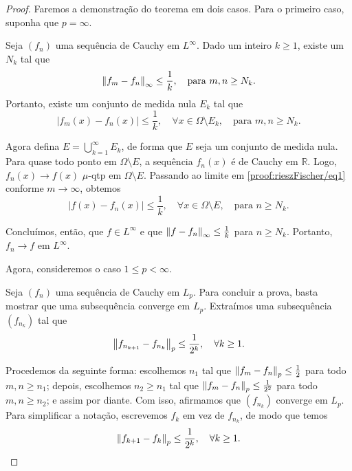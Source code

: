 \begin{proof}
    Faremos a demonstração do teorema em dois casos. Para o primeiro caso, suponha que $p=\infty$.

    Seja $(f_n)$ uma sequência de Cauchy em $L^\infty$. Dado um inteiro $k \geq 1$, existe um $N_k$ tal que
    \begin{equation}\label{proof:rieszFischer/eq1}
        \left\lVert f_m - f_n \right\rVert_\infty \leq \frac{1}{k}, \quad \text{para } m, n \geq N_k.
    \end{equation}
    Portanto, existe um conjunto de medida nula $E_k$ tal que
    \begin{equation*}
        |f_m(x) - f_n(x)| \leq \frac{1}{k}, \quad \forall x \in \Omega \setminus E_k, \quad \text{para } m, n \geq N_k.
    \end{equation*}

    Agora defina $E = \bigcup_{k=1}^\infty E_k$, de forma que $E$ seja um conjunto de medida nula. Para quase todo ponto em $\Omega \setminus E$, a sequência $f_n(x)$ é de Cauchy em $\mathbb{R}$. Logo, $f_n(x) \to f(x)$ $\mu$-qtp em $\Omega \setminus E$. Passando ao limite em \eqref{proof:rieszFischer/eq1} conforme $m \to \infty$, obtemos
    \begin{equation*}
        |f(x) - f_n(x)| \leq \frac{1}{k}, \quad \forall x \in \Omega \setminus E, \quad \text{para } n \geq N_k.
    \end{equation*}

    Concluímos, então, que $f \in L^\infty$ e que $\left\lVert f - f_n \right\rVert_\infty \leq \frac{1}{k}$ para $n \geq N_k$. Portanto, $f_n \to f$ em $L^\infty$.

    Agora, consideremos o caso $1 \leq p < \infty$. 

    Seja $(f_n)$ uma sequência de Cauchy em $L_p$. Para concluir a prova, basta mostrar que uma subsequência converge em $L_p$. Extraímos uma subsequência $(f_{n_k})$ tal que
    \begin{equation}\label{proof:rieszFischer/eq2}
        \left\lVert f_{n_{k+1}} - f_{n_k} \right\rVert_p \leq \frac{1}{2^k}, \quad \forall k \geq 1.
    \end{equation}

    Procedemos da seguinte forma: escolhemos $n_1$ tal que $\left\lVert f_m - f_n \right\rVert_p \leq \frac{1}{2}$ para todo $m, n \geq n_1$; depois, escolhemos $n_2 \geq n_1$ tal que $\left\lVert f_m - f_n \right\rVert_p \leq \frac{1}{2^2}$ para todo $m, n \geq n_2$; e assim por diante. Com isso, afirmamos que $(f_{n_k})$ converge em $L_p$. Para simplificar a notação, escrevemos $f_k$ em vez de $f_{n_k}$, de modo que temos
    \begin{equation*}
        \left\lVert f_{k+1} - f_k \right\rVert_p \leq \frac{1}{2^k}, \quad \forall k \geq 1.
    \end{equation*}


\end{proof}
